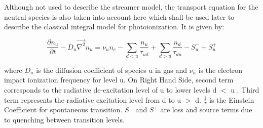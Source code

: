 \documentclass[paper=a4, fontsize=13pt]{scrartcl}
\begin{document}











Although not used to describe the streamer model, the transport equation for the neutral species is also taken into account here which shall be used later to describe the classical integral model for photoionization. It is given by:

\begin{equation} \label{eq:neutral species transport}
\frac{\partial n_u}{\partial t} - D_u \vec{\nabla^2} n_u = \nu_u n_e -\sum_{d < u}\frac{n_u}{\tau_{ud}} + \sum_{d > u}\frac{n_d}{\tau_{du}} - S_u^- + S_u^+ 
\end{equation}

where $D_u$ is the diffusion coefficient of species u in gas and $\nu_u$ is the electron impact ionization frequency for level u. On Right Hand Side, second term corresponds to the radiative de-excitation level of u to lower levels d $<$ u . Third term represents the radiative excitation level from d to u $>$ d. $\frac{1}{\tau}$ is the Einstein Coefficient for spontaneous transition. $S^-$ and $S^+$ are loss and source terms due to quenching between transition levels.  
\end{document}
